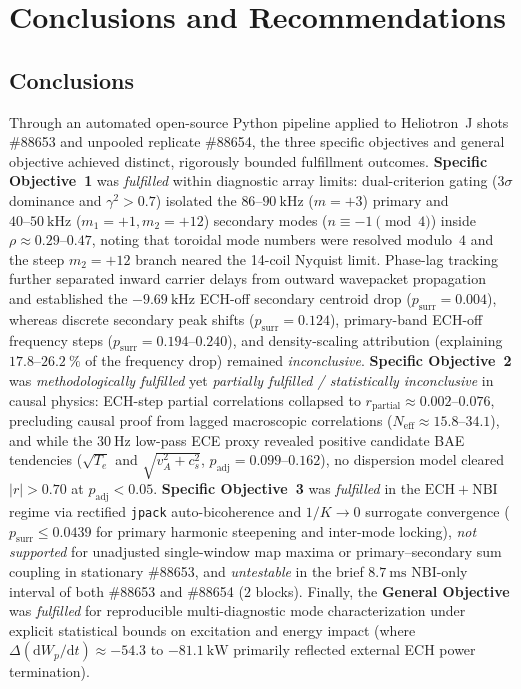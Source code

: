 \newpage
\section{Conclusions and Recommendations}
\label{sec:conclusions}

\subsection{Conclusions}
\label{subsec:conclusions}

Through an automated open-source Python pipeline applied to Heliotron~J shots \#88653 and unpooled replicate \#88654, the three specific objectives and general objective achieved distinct, rigorously bounded fulfillment outcomes. \textbf{Specific Objective~1} was \emph{fulfilled} within diagnostic array limits: dual-criterion gating ($3\sigma$ dominance and $\gamma^2 > 0.7$) isolated the $86\text{--}90~\mathrm{kHz}$ ($m=+3$) primary and $40\text{--}50~\mathrm{kHz}$ ($m_1=+1, m_2=+12$) secondary modes ($n \equiv -1 \pmod 4$) inside $\rho \approx 0.29\text{--}0.47$, noting that toroidal mode numbers were resolved modulo~$4$ and the steep $m_2 = +12$ branch neared the 14-coil Nyquist limit. Phase-lag tracking further separated inward carrier delays from outward wavepacket propagation and established the $-9.69~\mathrm{kHz}$ ECH-off secondary centroid drop ($p_{\mathrm{surr}} = 0.004$), whereas discrete secondary peak shifts ($p_{\mathrm{surr}} = 0.124$), primary-band ECH-off frequency steps ($p_{\mathrm{surr}} = 0.194\text{--}0.240$), and density-scaling attribution (explaining $17.8\text{--}26.2~\%$ of the frequency drop) remained \emph{inconclusive}. \textbf{Specific Objective~2} was \emph{methodologically fulfilled} yet \emph{partially fulfilled / statistically inconclusive} in causal physics: ECH-step partial correlations collapsed to $r_{\mathrm{partial}} \approx 0.002\text{--}0.076$, precluding causal proof from lagged macroscopic correlations ($N_{\mathrm{eff}} \approx 15.8\text{--}34.1$), and while the $30~\mathrm{Hz}$ low-pass ECE proxy revealed positive candidate BAE tendencies ($\sqrt{T_e}$ and $\sqrt{v_A^2+c_s^2}$, $p_{\mathrm{adj}} = 0.099\text{--}0.162$), no dispersion model cleared $|r| > 0.70$ at $p_{\mathrm{adj}} < 0.05$. \textbf{Specific Objective~3} was \emph{fulfilled} in the $\mathrm{ECH}+\mathrm{NBI}$ regime via rectified \texttt{jpack} auto-bicoherence and $1/K \to 0$ surrogate convergence ($p_{\mathrm{surr}} \le 0.0439$ for primary harmonic steepening and inter-mode locking), \emph{not supported} for unadjusted single-window map maxima or primary--secondary sum coupling in stationary \#88653, and \emph{untestable} in the brief $8.7~\mathrm{ms}$ $\mathrm{NBI}$-only interval of both \#88653 and \#88654 ($2$ blocks). Finally, the \textbf{General Objective} was \emph{fulfilled} for reproducible multi-diagnostic mode characterization under explicit statistical bounds on excitation and energy impact (where $\Delta(\mathrm{d}W_p/\mathrm{d}t) \approx -54.3$ to $-81.1~\mathrm{kW}$ primarily reflected external ECH power termination).


